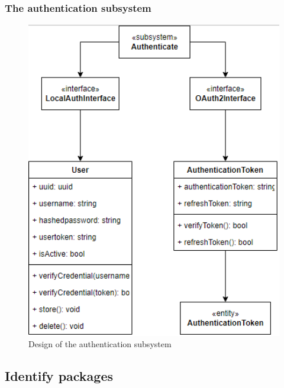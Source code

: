 \documentclass[a4paper]{article}
\begin{document}
\subsubsection{The authentication subsystem}
\begin{figure}[H]
    \centering
    \includegraphics[width=1.0\textwidth]{authentication_subsystem.png}
    \caption{Design of the authentication subsystem}
    \label{fig:fig33}
\end{figure}

\subsection{Identify packages}
\end{document}
